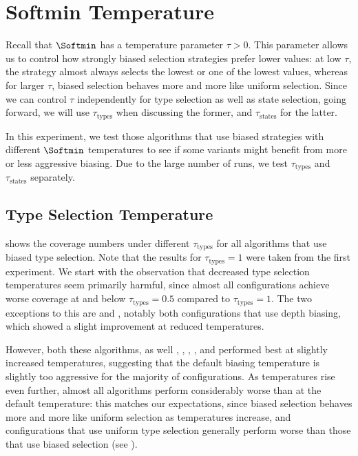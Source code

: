 \section{Softmin Temperature}

Recall that $\Softmin$ has a temperature parameter $\tau>0$. This parameter allows us to control how strongly biased selection strategies prefer lower values: at low $\tau$, the strategy almost always selects the lowest or one of the lowest values, whereas for larger $\tau$, biased selection behaves more and more like uniform selection. Since we can control $\tau$ independently for type selection as well as state selection, going forward, we will use $\tau_\text{types}$ when discussing the former, and $\tau_\text{states}$ for the latter.

In this experiment, we test those algorithms that use biased strategies with different $\Softmin$ temperatures to see if some variants might benefit from more or less aggressive biasing. Due to the large number of runs, we test $\tau_\text{types}$ and $\tau_\text{states}$ separately.

\subsection{Type Selection Temperature}

 shows the coverage numbers under different $\tau_\text{types}$ for all algorithms that use biased type selection. Note that the results for $\tau_\text{types}=1$ were taken from the first experiment. We start with the observation that decreased type selection temperatures seem primarily harmful, since almost all configurations achieve worse coverage at and below $\tau_\text{types}=0.5$ compared to $\tau_\text{types}=1$. The two exceptions to this are \hiDh and \lwDu, notably both configurations that use depth biasing, which showed a slight improvement at reduced temperatures.

However, both these algorithms, as well \hgHu, \hiHu, \hiDh, \lwHu, and \lwDh performed best at slightly increased temperatures, suggesting that the default biasing temperature is slightly too aggressive for the majority of configurations. As temperatures rise even further, almost all algorithms perform considerably worse than at the default temperature: this matches our expectations, since biased selection behaves more and more like uniform selection as temperatures increase, and configurations that use uniform type selection generally perform worse than those that use biased selection (see ).

